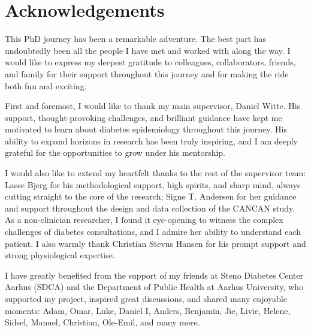 \documentclass[
  a4paper,
  headsepline=true,
  open=left]{scrbook}
\begin{document}

\hypertarget{acknowledgements}{%
\chapter*{Acknowledgements}\label{acknowledgements}}


This PhD journey has been a remarkable adventure. The best part has
undoubtedly been all the people I have met and worked with along the
way. I would like to express my deepest gratitude to colleagues,
collaborators, friends, and family for their support throughout this
journey and for making the ride both fun and exciting.

First and foremost, I would like to thank my main supervisor, Daniel
Witte. His support, thought-provoking challenges, and brilliant guidance
have kept me motivated to learn about diabetes epidemiology throughout
this journey. His ability to expand horizons in research has been truly
inspiring, and I am deeply grateful for the opportunities to grow under
his mentorship.

I would also like to extend my heartfelt thanks to the rest of the
supervisor team: Lasse Bjerg for his methodological support, high
spirits, and sharp mind, always cutting straight to the core of the
research; Signe T. Andersen for her guidance and support throughout the
design and data collection of the CANCAN study. As a non-clinician
researcher, I found it eye-opening to witness the complex challenges of
diabetes consultations, and I admire her ability to understand each
patient. I also warmly thank Christian Stevns Hansen for his prompt
support and strong physiological expertise.

I have greatly benefited from the support of my friends at Steno
Diabetes Center Aarhus (SDCA) and the Department of Public Health at
Aarhus University, who supported my project, inspired great discussions,
and shared many enjoyable moments: Adam, Omar, Luke, Daniel I, Anders,
Benjamin, Jie, Livie, Helene, Sidsel, Manuel, Christian, Ole-Emil, and
many more.
\end{document}
